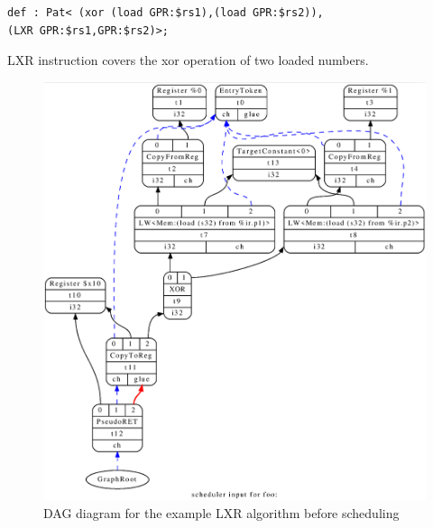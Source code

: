 \begin{lstlisting}
def : Pat< (xor (load GPR:$rs1),(load GPR:$rs2)),
(LXR GPR:$rs1,GPR:$rs2)>;
\end{lstlisting}

LXR instruction covers the xor operation of two loaded numbers.


\begin{figure}
    \centering
    \includegraphics[scale=0.25]{adding_new_instr/lxr_sched.png}
    \caption{DAG diagram for the example LXR algorithm before scheduling}
    \label{fig:lxr_sched_diagram}
\end{figure}


